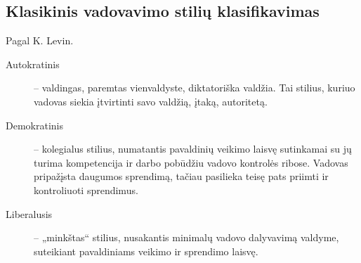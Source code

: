 \subsection{Klasikinis vadovavimo stilių klasifikavimas}

Pagal K. Levin.

\begin{description}
  \item[Autokratinis] – valdingas, paremtas vienvaldyste, diktatoriška
    valdžia. Tai stilius, kuriuo vadovas siekia įtvirtinti savo valdžią,
    įtaką, autoritetą.
  \item[Demokratinis] – kolegialus stilius, numatantis pavaldinių
    veikimo laisvę sutinkamai su jų turima kompetencija ir darbo
    pobūdžiu vadovo kontrolės ribose. Vadovas pripažįsta daugumos
    sprendimą, tačiau pasilieka teisę pats priimti ir kontroliuoti
    sprendimus.
  \item[Liberalusis] – „minkštas“ stilius, nusakantis minimalų vadovo
    dalyvavimą valdyme, suteikiant pavaldiniams veikimo ir sprendimo
    laisvę.
\end{description}

